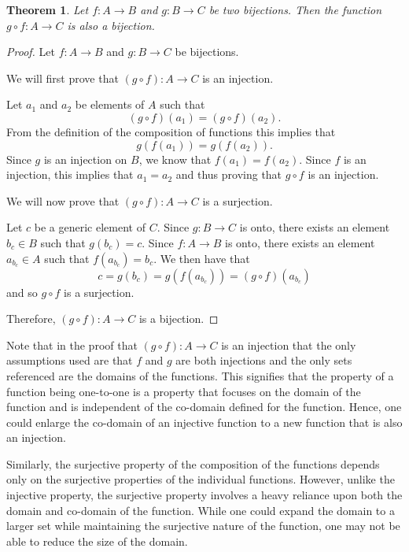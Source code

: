 \documentclass[
]{book}
\newtheorem{theorem}{Theorem}[chapter]
\theoremstyle{definition}
\theoremstyle{definition}
\theoremstyle{definition}
\theoremstyle{remark}
\begin{document}
\begin{theorem}
\protect\hypertarget{thm:bijection2}{}{\label{thm:bijection2} }Let \(f:A \rightarrow B\) and \(g:B \rightarrow C\) be two bijections. Then the function \(g\circ f : A \rightarrow C\) is also a bijection.
\end{theorem}

\begin{proof}
{}Let \(f:A \rightarrow B\) and \(g:B\rightarrow C\) be bijections.

We will first prove that \((g\circ f):A\rightarrow C\) is an injection.

Let \(a_1\) and \(a_2\) be elements of \(A\) such that \[(g\circ f)(a_1)=(g\circ f)(a_2).\]
From the definition of the composition of functions this implies that \[g\left( f(a_1)\right) = g\left(f(a_2)\right).\]
Since \(g\) is an injection on \(B\), we know that \(f(a_1)=f(a_2)\). Since \(f\) is an injection, this implies that \(a_1=a_2\) and thus proving that \(g\circ f\) is an injection.

We will now prove that \((g\circ f):A\rightarrow C\) is a surjection.

Let \(c\) be a generic element of \(C\). Since \(g:B\rightarrow C\) is onto, there exists an element \(b_c\in B\) such that \(g(b_c)=c\). Since \(f:A \rightarrow B\) is onto, there exists an element \(a_{b_c}\in A\) such that \(f\left(a_{b_c}\right) = b_c\). We then have that \[c=g(b_c)=g\left( f\left(a_{b_c}\right) \right) = (g \circ f) \left( a_{b_c}\right)\] and so \(g\circ f\) is a surjection.

Therefore, \((g\circ f):A \rightarrow C\) is a bijection.
\end{proof}

Note that in the proof that \((g\circ f):A \rightarrow C\) is an injection that the only assumptions used are that \(f\) and \(g\) are both injections and the only sets referenced are the domains of the functions. This signifies that the property of a function being one-to-one is a property that focuses on the domain of the function and is independent of the co-domain defined for the function. Hence, one could enlarge the co-domain of an injective function to a new function that is also an injection.

Similarly, the surjective property of the composition of the functions depends only on the surjective properties of the individual functions. However, unlike the injective property, the surjective property involves a heavy reliance upon both the domain and co-domain of the function. While one could expand the domain to a larger set while maintaining the surjective nature of the function, one may not be able to reduce the size of the domain.
\end{document}
